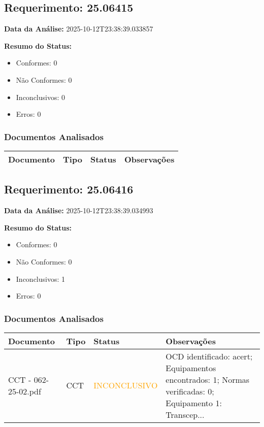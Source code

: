 \documentclass[12pt,a4paper]{article}
\begin{document}
\subsection{Requerimento: 25.06415}

\textbf{Data da Análise:} 2025-10-12T23:38:39.033857

\textbf{Resumo do Status:}
\begin{itemize}
    \item Conformes: 0
    \item Não Conformes: 0
    \item Inconclusivos: 0
    \item Erros: 0
\end{itemize}

\subsubsection{Documentos Analisados}

\begin{longtable}{|p{4cm}|p{2cm}|p{2cm}|p{6cm}|}
\hline
\textbf{Documento} & \textbf{Tipo} & \textbf{Status} & \textbf{Observações} \\
\hline
\endhead
\end{longtable}


\subsection{Requerimento: 25.06416}

\textbf{Data da Análise:} 2025-10-12T23:38:39.034993

\textbf{Resumo do Status:}
\begin{itemize}
    \item Conformes: 0
    \item Não Conformes: 0
    \item Inconclusivos: 1
    \item Erros: 0
\end{itemize}

\subsubsection{Documentos Analisados}

\begin{longtable}{|p{4cm}|p{2cm}|p{2cm}|p{6cm}|}
\hline
\textbf{Documento} & \textbf{Tipo} & \textbf{Status} & \textbf{Observações} \\
\hline
\endhead
CCT - 062-25-02.pdf & CCT & \textcolor{orange}{INCONCLUSIVO} & OCD identificado: acert; Equipamentos encontrados: 1; Normas verificadas: 0; Equipamento 1: Transcep... \\
\hline
\end{longtable}
\end{document}
